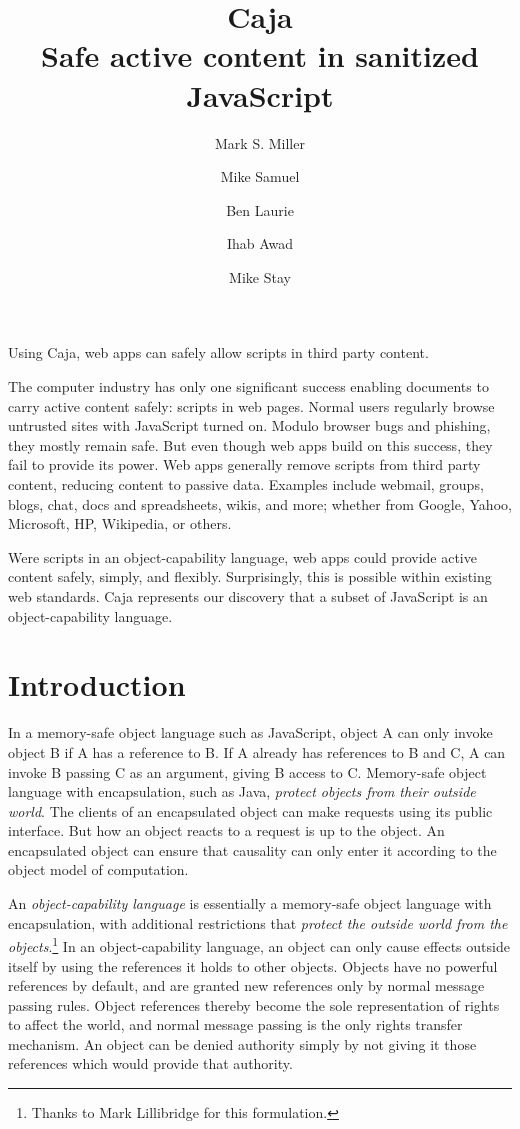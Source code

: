 \documentclass[letterpaper,twocolumn,10pt]{article}
\title{Caja\\
Safe active content in sanitized JavaScript}
\author{
        {\rm Mark S. Miller}
        \and 
        {\rm Mike Samuel}
        \and 
        {\rm Ben Laurie}
        \and 
        {\rm Ihab Awad}
        \and 
        {\rm Mike Stay}}
\begin{document}
\maketitle


\abstract

Using Caja, web apps can safely allow scripts in third party content.

The computer industry has only one significant success enabling documents to 
carry active content safely: scripts in web pages. Normal users regularly 
browse untrusted sites with JavaScript turned on. Modulo browser bugs and 
phishing, they mostly remain safe. But even though web apps build on this 
success, they fail to provide its power. Web apps generally remove scripts 
from third party content, reducing content to passive data. Examples include 
webmail, groups, blogs, chat, docs and spreadsheets, wikis, and more; whether 
from Google, Yahoo, Microsoft, HP, Wikipedia, or others.

Were scripts in an object-capability language, web apps could provide active 
content safely, simply, and flexibly. Surprisingly, this is possible within 
existing web standards. Caja represents our discovery that a subset of 
JavaScript is an object-capability language.

\section{Introduction}

In a memory-safe object language such as JavaScript, object A can only invoke 
object B if A has a reference to B. If A already has references to B and C, A 
can invoke B passing C as an argument, giving B access to C. Memory-safe 
object language with encapsulation, such as Java, \emph{protect objects from 
their outside world}. The clients of an encapsulated object can make requests 
using its public interface. But how an object reacts to a request is up to 
the object. An encapsulated object can ensure that causality can only enter 
it according to the object model of computation.

An \emph{object-capability language} is essentially a memory-safe object 
language with encapsulation, with additional restrictions that \emph{protect 
the outside world from the objects}.\footnote{
%
Thanks to Mark Lillibridge for this formulation.
%
} In an object-capability language, an object can only cause effects outside 
itself by using the references it holds to other objects. Objects have no 
powerful references by default, and are granted new references only by normal 
message passing rules. Object references thereby become the sole 
representation of rights to affect the world, and normal message passing is 
the only rights transfer mechanism. An object can be denied authority simply 
by not giving it those references which would provide that authority.
\end{document}
